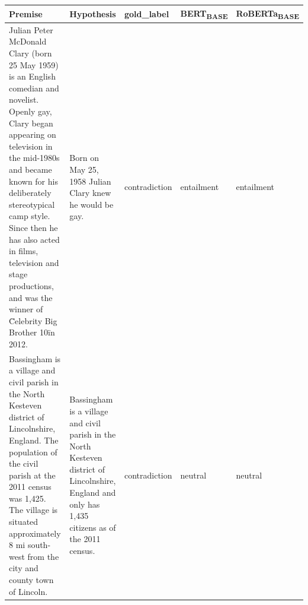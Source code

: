 \begin{table}
\small
\centering
\begin{tabular}{p{5cm}p{3cm}lll}

\toprule

\textbf{Premise} & \textbf{Hypothesis} & \textbf{gold\_label} & \textbf{BERT\textsubscript{BASE} } & \textbf{RoBERTa\textsubscript{BASE} } \\

\midrule
{Julian Peter McDonald Clary (born 25 May 1959) is an English comedian and novelist. Openly gay, Clary began appearing on television in the mid-1980s and became known for his deliberately stereotypical camp style. Since then he has also acted in films, television and stage productions, and was the winner of \"Celebrity Big Brother 10\" in 2012.}        
& {Born on May 25, 1958 Julian Clary knew he would be gay.}           
& {contradiction}            
& {entailment}     
& {entailment}        \\


\midrule
{Bassingham is a village and civil parish in the North Kesteven district of Lincolnshire, England. The population of the civil parish at the 2011 census was 1,425. The village is situated approximately 8 mi south-west from the city and county town of Lincoln.}        
& {Bassingham is a village and civil parish in the North Kesteven district of Lincolnshire, England and only has 1,435 citizens as of the 2011 census.}           
& {contradiction}            
& {neutral}     
& {neutral}        \\



\end{tabular}
\end{table}
